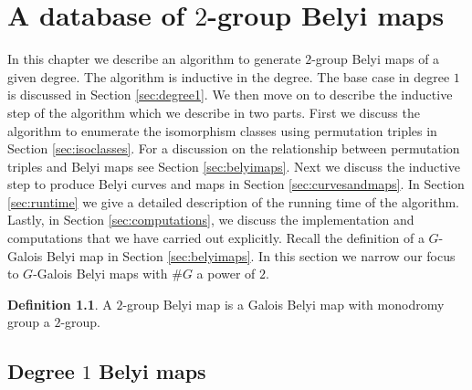 \documentclass{dcthesis}
\newcommand{\defi}[1]{\textsf{#1}}
\theoremstyle{definition}
\newtheorem{definition}[prop]{Definition}
\theoremstyle{remark}
\numberwithin{equation}{section}
\numberwithin{figure}{section}
\begin{document}
\chapter{A database of $2$-group Belyi maps}{\label{chapter:database}
  In this chapter we describe an algorithm
  to generate $2$-group Belyi maps of a given degree.
  The algorithm is inductive in the degree.
  The base case in degree $1$ is discussed in Section \ref{sec:degree1}.
  We then move on to describe the inductive step of the algorithm
  which we describe in two parts.
  First we discuss the algorithm to enumerate the isomorphism classes
  using permutation triples in Section \ref{sec:isoclasses}.
  For a discussion on the relationship between permutation triples and Belyi maps
  see Section \ref{sec:belyimaps}.
  Next we discuss the inductive step to produce Belyi curves and maps in Section \ref{sec:curvesandmaps}.
  In Section \ref{sec:runtime} we give a detailed description of the running time of the algorithm.
  Lastly,
  in Section \ref{sec:computations},
  we discuss the implementation and computations that we have carried out explicitly.
  Recall the definition of a $G$-Galois Belyi map in Section \ref{sec:belyimaps}.
  In this section we narrow our focus
  to $G$-Galois Belyi maps with $\#G$ a power of $2$.
  \begin{definition}\label{def:2groupbelyi}
    A \defi{$2$-group Belyi map} is a Galois Belyi map
    with monodromy group a $2$-group.
  \end{definition}
  \section{Degree $1$ Belyi maps}{\label{sec:degree1}
  }
}
\end{document}
